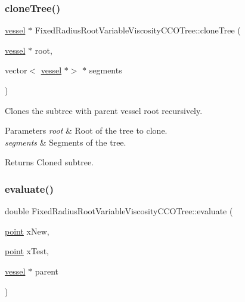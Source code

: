 \subsubsection{\texorpdfstring{clone\+Tree()}{cloneTree()}}
{\footnotesize\ttfamily \mbox{\hyperlink{structvessel}{vessel}} $\ast$ Fixed\+Radius\+Root\+Variable\+Viscosity\+C\+C\+O\+Tree\+::clone\+Tree (\begin{DoxyParamCaption}\item[{\mbox{\hyperlink{structvessel}{vessel}} $\ast$}]{root,  }\item[{vector$<$ \mbox{\hyperlink{structvessel}{vessel}} $\ast$$>$ $\ast$}]{segments }\end{DoxyParamCaption})\hspace{0.3cm}{\ttfamily [private]}}

Clones the subtree with parent vessel {\ttfamily root} recursively. 
\begin{DoxyParams}{Parameters}
{\em root} & Root of the tree to clone. \\
\hline
{\em segments} & Segments of the tree. \\
\hline
\end{DoxyParams}
\begin{DoxyReturn}{Returns}
Cloned subtree. 
\end{DoxyReturn}
\mbox{\label{class_fixed_radius_root_variable_viscosity_c_c_o_tree_aa58addfca3eba5e1ff11344b252e3f0f}} 
\subsubsection{\texorpdfstring{evaluate()}{evaluate()}}
{\footnotesize\ttfamily double Fixed\+Radius\+Root\+Variable\+Viscosity\+C\+C\+O\+Tree\+::evaluate (\begin{DoxyParamCaption}\item[{\mbox{\hyperlink{structpoint}{point}}}]{x\+New,  }\item[{\mbox{\hyperlink{structpoint}{point}}}]{x\+Test,  }\item[{\mbox{\hyperlink{structvessel}{vessel}} $\ast$}]{parent }\end{DoxyParamCaption})\hspace{0.3cm}{\ttfamily [private]}}

